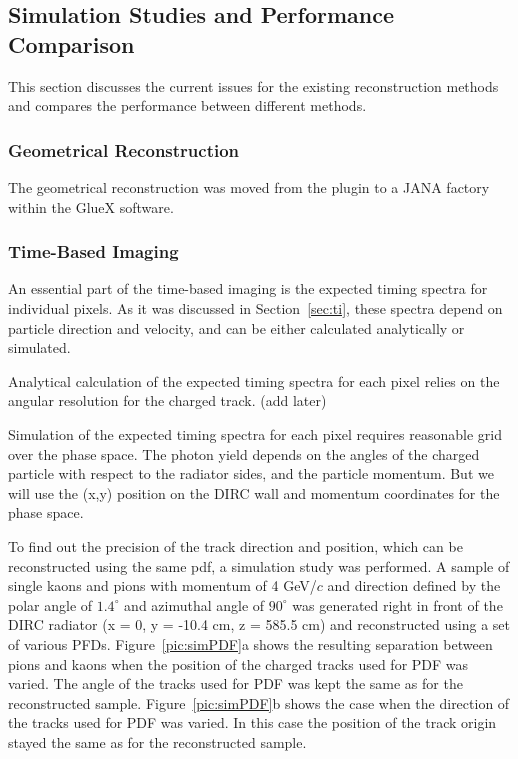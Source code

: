 \subsection{Simulation Studies and Performance Comparison}
\label{sec:com}

This section discusses the current issues for the existing reconstruction methods and compares the performance between different methods.

\subsubsection{Geometrical Reconstruction}

The geometrical reconstruction was moved from the plugin to a JANA factory within the GlueX software. 

\subsubsection{Time-Based Imaging}

An essential part of the time-based imaging is the expected timing spectra for individual pixels. As it was discussed in Section~\ref{sec:ti}, these spectra depend on particle direction and velocity, and can be either calculated analytically or simulated.

Analytical calculation of the expected timing spectra for each pixel relies on the angular resolution for the charged track. (add later)

Simulation of the expected timing spectra for each pixel requires reasonable grid over the phase space. The photon yield depends on the angles of the charged particle with respect to the radiator sides, and the particle momentum. But we will use the (x,y) position on the DIRC wall and momentum coordinates for the phase space.

To find out the precision of the track direction and position, which can be reconstructed using the same pdf, a simulation study was performed. A sample of single kaons and pions with momentum of 4 GeV/$c$ and direction defined by the polar angle of $1.4^{\circ}$ and azimuthal angle of $90^{\circ}$ was generated right in front of the DIRC radiator (x = 0, y = -10.4 cm, z = 585.5 cm) and reconstructed using a set of various PFDs. Figure~\ref{pic:simPDF}a shows the resulting separation between pions and kaons when the position of the charged tracks used for PDF was varied. The angle of the tracks used for PDF was kept the same as for the reconstructed sample. Figure~\ref{pic:simPDF}b shows the case when the direction of the tracks used for PDF was varied. In this case the position of the track origin stayed the same as for the reconstructed sample.

